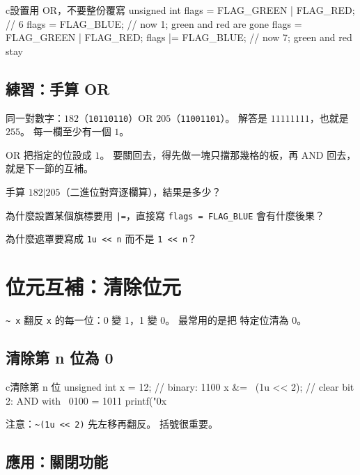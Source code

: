\begin{code}{c}{設置用 OR，不要整份覆寫}
unsigned int flags = FLAG_GREEN | FLAG_RED;  // 6
flags = FLAG_BLUE;     // now 1; green and red are gone
flags = FLAG_GREEN | FLAG_RED;
flags |= FLAG_BLUE;    // now 7; green and red stay
\end{code}

\subsection{練習：手算 OR}

同一對數字：$182$（\texttt{10110110}）OR $205$（\texttt{11001101}）。
解答是 $11111111$，也就是 $255$。 每一欄至少有一個 $1$。

OR 把指定的位設成 $1$。 要關回去，得先做一塊只擋那幾格的板，再 AND
回去，就是下一節的互補。


\begin{drills}[label=drills:bit-or]
\item 手算 $182 | 205$（二進位對齊逐欄算），結果是多少？
\item 為什麼設置某個旗標要用 \texttt{|=}，直接寫 \texttt{flags =
FLAG\_BLUE} 會有什麼後果？
\item 為什麼遮罩要寫成 \texttt{1u << n} 而不是 \texttt{1 << n}？
\end{drills}

\section{位元互補：清除位元}
\label{sec:bit-complement}

\texttt{\~{} x} 翻反 \texttt{x} 的每一位：0 變 1，1 變 0。 最常用的是把
特定位清為 0。

\subsection{清除第 n 位為 0}

\begin{code}{c}{清除第 n 位}
unsigned int x = 12;   // binary: 1100
x &= ~(1u << 2);      // clear bit 2: AND with ~0100 = 1011
printf("0x%
\end{code}

注意：\texttt{\~{}(1u << 2)} 先左移再翻反。 括號很重要。

\subsection{應用：關閉功能}

